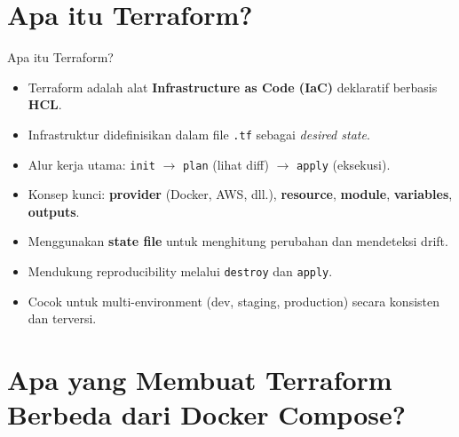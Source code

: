 \documentclass[aspectratio=169, table]{beamer}
\begin{document}
\section{Apa itu Terraform?}

\begin{frame}{Apa itu Terraform?}
	\vspace{6pt}
	\begin{itemize}
		\item Terraform adalah alat \textbf{Infrastructure as Code (IaC)} deklaratif berbasis \textbf{HCL}.
		\item Infrastruktur didefinisikan dalam file \texttt{.tf} sebagai \textit{desired state}.
		\item Alur kerja utama: \texttt{init} $\rightarrow$ \texttt{plan} (lihat diff) $\rightarrow$ \texttt{apply} (eksekusi).
		\item Konsep kunci: \textbf{provider} (Docker, AWS, dll.), \textbf{resource}, \textbf{module}, \textbf{variables}, \textbf{outputs}.
		\item Menggunakan \textbf{state file} untuk menghitung perubahan dan mendeteksi drift.
		\item Mendukung reproducibility melalui \texttt{destroy} dan \texttt{apply}.
		\item Cocok untuk multi-environment (dev, staging, production) secara konsisten dan terversi.
	\end{itemize}
\end{frame}

\section{Apa yang Membuat Terraform Berbeda dari Docker Compose?}
\end{document}
